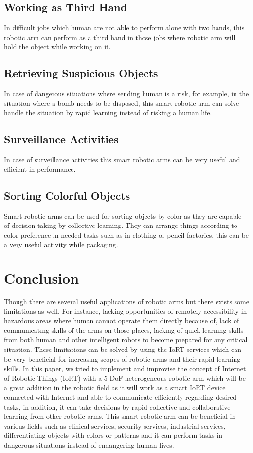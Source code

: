 \documentclass[conference]{IEEEtran}
\begin{document}
\subsection{Working as Third Hand}
In difficult jobs which human are not able to perform alone with two hands, this robotic arm can perform as a third hand in those jobs where robotic arm will hold the object while working on it.

\subsection{Retrieving Suspicious Objects}
In case of dangerous situations where sending human is a risk, for example, in the situation where a bomb needs to be disposed, this smart robotic arm can solve handle the situation by rapid learning instead of risking a human life.

\subsection{Surveillance Activities}
In case of surveillance activities this smart robotic arms can be very useful and efficient in performance.

\subsection{Sorting Colorful Objects}
Smart robotic arms can be used for sorting objects by color as they are capable of decision taking by collective learning. They can arrange things according to color preference in needed tasks such as in clothing or pencil factories, this can be a very useful activity while packaging.


\section{Conclusion}

Though there are several useful applications of robotic arms but there exists some limitations as well. For instance, lacking opportunities of remotely accessibility in hazardous areas where human cannot operate them directly because of, lack of communicating skills of the arms on those places, lacking of quick learning skills from both human and other intelligent robots to become prepared for any critical situation. These limitations can be solved by using the IoRT services which can be very beneficial for increasing scopes of robotic arms and their rapid learning skills.
In this paper, we tried to implement and improvise the concept of Internet of Robotic Things (IoRT) with a 5 DoF heterogeneous robotic arm which will be a great addition in the robotic field as it will work as a smart IoRT device connected with Internet and able to communicate efficiently regarding desired tasks, in addition, it can take decisions by rapid collective and collaborative learning from other robotic arms. This smart robotic arm can be beneficial in various fields such as clinical services, security services, industrial services, differentiating objects with colors or patterns and it can perform tasks in dangerous situations instead of endangering human lives.
\end{document}
